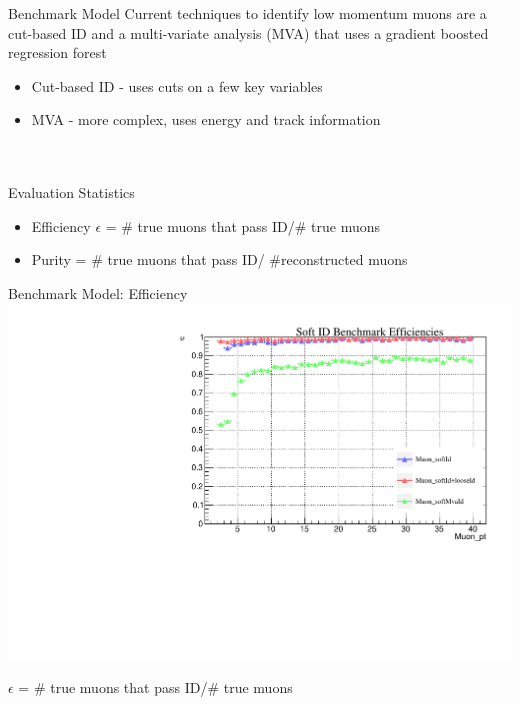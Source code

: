 \documentclass[10pt,handout]{beamer}
\begin{document}
\begin{frame}{Benchmark Model}
Current techniques to identify low momentum muons are a cut-based ID and a multi-variate analysis (MVA) that uses a gradient boosted regression forest
\quad \\
\begin{itemize}
\item Cut-based ID - uses cuts on a few key variables
\item MVA - more complex, uses energy and track information
\end{itemize}
\quad \\
\quad \\
Evaluation Statistics
\begin{itemize}
\item Efficiency $\epsilon$ = \# true muons that pass ID/\# true muons
\item Purity = \# true muons that pass ID/ \#reconstructed muons
\end{itemize}
\end{frame}




\begin{frame}{Benchmark Model: Efficiency}
\centering
\includegraphics[scale=.5]{benchmarkEfficiency_TTjets.pdf}

$\epsilon$ = \# true muons that pass ID/\# true muons
\end{frame}
\end{document}
